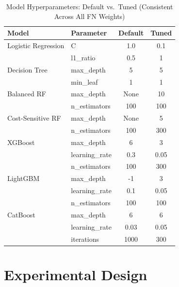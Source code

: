 \documentclass{article}
\begin{document}
\begin{table}[htbp]
\centering
\caption{Model Hyperparameters: Default vs.\ Tuned (Consistent Across All FN Weights)}
\label{tab:hyperparams}
\begin{tabular}{llcc}
\toprule
\textbf{Model} & \textbf{Parameter} & \textbf{Default} & \textbf{Tuned} \\
\midrule
Logistic Regression & C              & 1.0  & 0.1  \\
                    & l1\_ratio      & 0.5  & 1    \\
Decision Tree       & max\_depth     & 5    & 5    \\
                    & min\_leaf      & 1    & 1    \\
Balanced RF         & max\_depth     & None & 10   \\
                    & n\_estimators  & 100  & 100  \\
Cost-Sensitive RF   & max\_depth     & None & 5    \\
                    & n\_estimators  & 100  & 300  \\
XGBoost             & max\_depth     & 6    & 3    \\
                    & learning\_rate & 0.3  & 0.05 \\
                    & n\_estimators  & 100  & 300  \\
LightGBM            & max\_depth     & -1   & 3    \\
                    & learning\_rate & 0.1  & 0.05 \\
                    & n\_estimators  & 100  & 100  \\
CatBoost            & max\_depth     & 6    & 6    \\
                    & learning\_rate & 0.03 & 0.05 \\
                    & iterations     & 1000 & 300  \\
\bottomrule
\end{tabular}
\end{table}
 

\section{Experimental Design}
\end{document}
